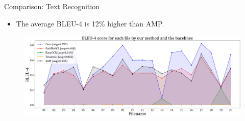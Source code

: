 \documentclass{beamer}
\begin{document}
\begin{frame}
    \begin{center}
        \Large{Comparison: Text Recognition}
    \end{center}
    \begin{itemize}
        \item The average BLEU-4 is 12\% higher than AMP.
    \end{itemize}
    \begin{figure}
        \centering
        \includegraphics[width=\textwidth]{figures/comp_bleu.png}
    \end{figure}
\end{frame}
\end{document}

